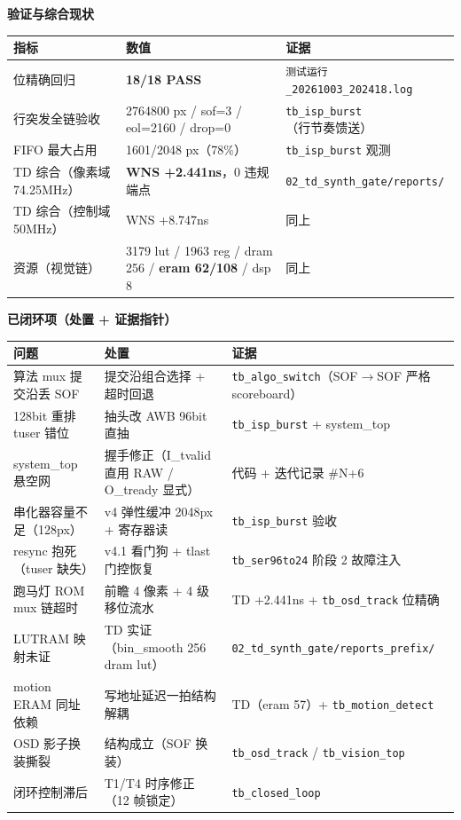 \documentclass[10pt]{ctexart}
\newcommand{\code}[1]{\texttt{#1}}
\begin{document}
\textbf{验证与综合现状}
\begin{center}
{\small
\begin{tabular}{p{4.6cm}p{5.6cm}p{6.6cm}}
\toprule
\rowcolor{rowtint}\textbf{指标} & \textbf{数值} & \textbf{证据} \\
\midrule
位精确回归 & \textbf{18/18 PASS} & \code{测试运行\_20261003\_202418.log} \\
行突发全链验收 & 2764800 px / sof=3 / eol=2160 / drop=0 & \code{tb\_isp\_burst}（行节奏馈送）\\
FIFO 最大占用 & 1601/2048 px（78\%）& \code{tb\_isp\_burst} 观测 \\
TD 综合（像素域 74.25MHz）& \textbf{WNS +2.441ns}，0 违规端点 & \code{02\_td\_synth\_gate/reports/} \\
TD 综合（控制域 50MHz）& WNS +8.747ns & 同上 \\
资源（视觉链）& 3179 lut / 1963 reg / dram 256 / \textbf{eram 62/108} / dsp 8 & 同上 \\
\bottomrule
\end{tabular}}
\end{center}

\textbf{已闭环项（处置 + 证据指针）}
\begin{center}
{\small
\begin{tabular}{p{4.2cm}p{5.4cm}p{7.2cm}}
\toprule
\rowcolor{rowtint}\textbf{问题} & \textbf{处置} & \textbf{证据} \\
\midrule
算法 mux 提交沿丢 SOF & 提交沿组合选择 + 超时回退 & \code{tb\_algo\_switch}（SOF$\to$SOF 严格 scoreboard）\\
128bit 重排 tuser 错位 & 抽头改 AWB 96bit 直抽 & \code{tb\_isp\_burst} + system\_top \\
system\_top 悬空网 & 握手修正（I\_tvalid 直用 RAW / O\_tready 显式）& 代码 + 迭代记录 \#N+6 \\
串化器容量不足（128px）& v4 弹性缓冲 2048px + 寄存器读 & \code{tb\_isp\_burst} 验收 \\
resync 抱死（tuser 缺失）& v4.1 看门狗 + tlast 门控恢复 & \code{tb\_ser96to24} 阶段 2 故障注入 \\
跑马灯 ROM mux 链超时 & 前瞻 4 像素 + 4 级移位流水 & TD +2.441ns + \code{tb\_osd\_track} 位精确 \\
LUTRAM 映射未证 & TD 实证（bin\_smooth 256 dram lut）& \code{02\_td\_synth\_gate/reports\_prefix/} \\
motion ERAM 同址依赖 & 写地址延迟一拍结构解耦 & TD（eram 57）+ \code{tb\_motion\_detect} \\
OSD 影子换装撕裂 & 结构成立（SOF 换装）& \code{tb\_osd\_track} / \code{tb\_vision\_top} \\
闭环控制滞后 & T1/T4 时序修正（12 帧锁定）& \code{tb\_closed\_loop} \\
\bottomrule
\end{tabular}}
\end{center}
\end{document}
